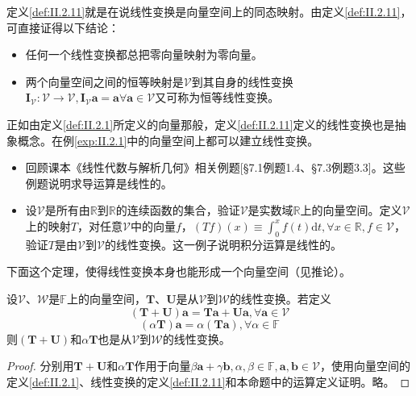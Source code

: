 \documentclass[main.tex]{subfiles}
\begin{document}
定义\ref{def:II.2.11}就是在说线性变换是向量空间上的同态映射。由定义\ref{def:II.2.11}，可直接证得以下结论：
\begin{itemize}
    \item 任何一个线性变换都总把零向量映射为零向量。
    \item 两个向量空间之间的恒等映射是$\mathcal{V}$到其自身的线性变换$\mathbf{I}_{\mathcal{V}}:\mathcal{V}\rightarrow\mathcal{V},\mathbf{I}_{\mathcal{V}}\mathbf{a}=\mathbf{a}\forall\mathbf{a}\in\mathcal{V}$又可称为恒等线性变换。
\end{itemize}

正如由定义\ref{def:II.2.1}所定义的向量那般，定义\ref{def:II.2.11}定义的线性变换也是抽象概念。在例\ref{exp:II.2.1}中的向量空间上都可以建立线性变换。

\begin{example}\label{exp:II.2.9}
    \begin{itemize}
        \item 回顾课本《线性代数与解析几何》相关例题\cite{周胜林2012线性代数}[\S 7.1例题1.4、\S 7.3例题3.3]。这些例题说明求导运算是线性的。
        \item 设$\mathcal{V}$是所有由$\mathbb{R}$到$\mathbb{R}$的连续函数的集合，验证$\mathcal{V}$是实数域$\mathbb{R}$上的向量空间。定义$\mathcal{V}$上的映射$T$，对任意$\mathcal{V}$中的向量$f$，$\left(Tf\right)\left(x\right)\equiv\int_0^x f\left(t\right)\mathrm{d}t,\forall x\in\mathbb{R},f\in\mathcal{V}$，验证$T$是由$\mathcal{V}$到$\mathcal{V}$的线性变换。这一例子说明积分运算是线性的。
    \end{itemize}
\end{example}


下面这个定理，使得线性变换本身也能形成一个向量空间（见推论）。

\begin{theorem}\label{thm:II.2.6}
    设$\mathcal{V}$、$\mathcal{W}$是$\mathbb{F}$上的向量空间，$\mathbf{T}$、$\mathbf{U}$是从$\mathcal{V}$到$\mathcal{W}$的线性变换。若定义
    \[\left(\mathbf{T}+\mathbf{U}\right)\mathbf{a}=\mathbf{Ta}+\mathbf{Ua},\forall\mathbf{a}\in\mathcal{V}\]
    \[\left(\alpha\mathbf{T}\right)\mathbf{a}=\alpha\left(\mathbf{Ta}\right),\forall\alpha\in\mathbb{F}\]
    则$\left(\mathbf{T}+\mathbf{U}\right)$和$\alpha\mathbf{T}$也是从$\mathcal{V}$到$\mathcal{W}$的线性变换。
\end{theorem}
\begin{proof}
    分别用$\mathbf{T}+\mathbf{U}$和$\alpha\mathbf{T}$作用于向量$\beta\mathbf{a}+\gamma\mathbf{b},\alpha,\beta\in\mathbb{F},\mathbf{a},\mathbf{b}\in\mathcal{V}$，使用向量空间的定义\ref{def:II.2.1}、线性变换的定义\ref{def:II.2.11}和本命题中的运算定义证明。略。
\end{proof}
\end{document}
